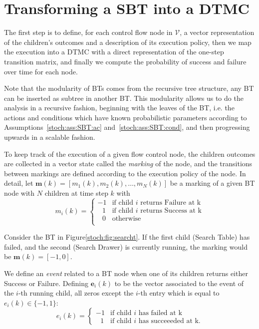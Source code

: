 \section{Transforming a SBT into a DTMC}
\label{stoch:sec:SBTtoDTCM}
The first step is to define, for each control flow node in $\mathcal{V}$, a vector representation of the children's outcomes and a description of its execution policy, then we map the execution into a DTMC with a direct representation of the one-step transition matrix, and finally we compute the probability of success and failure over time for each node.  

Note that the modularity of BTs comes from the recursive tree structure, any BT can be inserted as subtree in another BT.
This modularity allows us to do the analysis in a recursive fashion, beginning with the leaves of the BT, i.e. the actions and conditions which have known probabilistic parameters according to Assumptions~\ref{stoch:ass:SBT:ac} and~\ref{stoch:ass:SBT:cond}, and then progressing upwards in a scalable fashion.


 To keep track of the execution of a given flow control node,
the children outcomes  are collected in a vector state called the \emph{marking} of the node, and the transitions between markings are defined according to the execution policy of the node. 
In detail, let $\mathbf{m}(k)=[m_1(k),m_2(k),\ldots,m_N(k)]$ be a marking of a given BT node with $N$ children at time step $k$ with
\begin{equation}
m_i(k) =
	 \begin{cases} -1 &\mbox{if child $i$ returns Failure  at k}  \\
 		\hspace{8pt}1 & \mbox{if child $i$ returns Success  at k}\\
 		\hspace{8pt}0  & \mbox{otherwise} \\
 	\end{cases} 
\end{equation}
\begin{example}
\label{stoch:ex:Marking}
 Consider the BT in Figure\ref{stoch:fig:searcht}. If the first child (Search Table) has failed, and the second (Search Drawer) is currently running, the marking would be $\mathbf{m}(k)=[-1,0]$.
\end{example}
We define an \emph{event} related to a BT node when one of its children returns either Success or Failure.
Defining $\mathbf{e}_i(k)$ to be the vector associated to the event of the $i$-th running child, all zeros except the $i$-th entry which is equal to $e_i(k) \in \{-1,1\}$:
 \begin{equation}
e_i(k) = \begin{cases} -1 &\mbox{if child $i$ has failed at k}  \\
\hspace{8pt}1 & \mbox{if child $i$ has succeeeded at k.}
 \end{cases} 
\end{equation}


